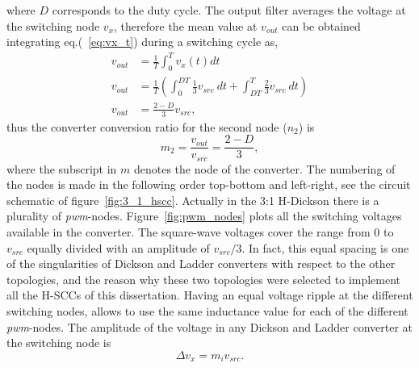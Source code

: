 where $D$ corresponds to the duty cycle. The output filter averages the voltage at the switching node $v_x$, therefore the mean value at $v_{out}$ can be obtained integrating eq.(~\ref{eq:vx_t}) during a switching cycle as,
\begin{align}
 v_{out} & = \frac{1}{T} \int_{0}^{T}  v_x(t) dt \\[3ex]
 v_{out} & = \frac{1}{T} \left( \int_{0}^{DT} \frac{1}{3} v_{src} ~dt + \int_{DT}^{T} \frac{2}{3} v_{src} ~dt \right) \\[3ex]
 v_{out} & = \frac{2-D}{3} v_{src},
 \label{eq:int_vx_t}
\end{align}
thus the converter conversion ratio for the second node ($n_2$) is
\begin{equation}
 m_2   = \frac{v_{out}}{v_{src}} = \frac{2-D}{3},
 \label{eq:int_vx_t}
\end{equation}
where the subscript in $m$ denotes the node of the converter. The numbering of the nodes is made in the following order top-bottom and left-right, see the circuit schematic of figure~\ref{fig:3_1_hscc}. Actually in the 3:1 H-Dickson there is a plurality of \emph{pwm}-nodes. Figure~\ref{fig:pwm_nodes} plots all the switching voltages available in the converter. The square-wave voltages cover the range from 0 to $v_{src}$ equally divided with an amplitude of $v_{src}/3$. In fact, this equal spacing is one of the singularities of Dickson and Ladder converters with respect to the other topologies, and the reason why these two topologies were selected to implement all the H-SCCs of this dissertation. Having an equal voltage ripple at the different switching nodes, allows to use the same inductance value for each of the different \emph{pwm}-nodes. The amplitude of the voltage in any Dickson and Ladder converter at the switching node is
\begin{equation}
\Delta v_x = m_i v_{src}.
\label{eq:del_vx}
\end{equation}

